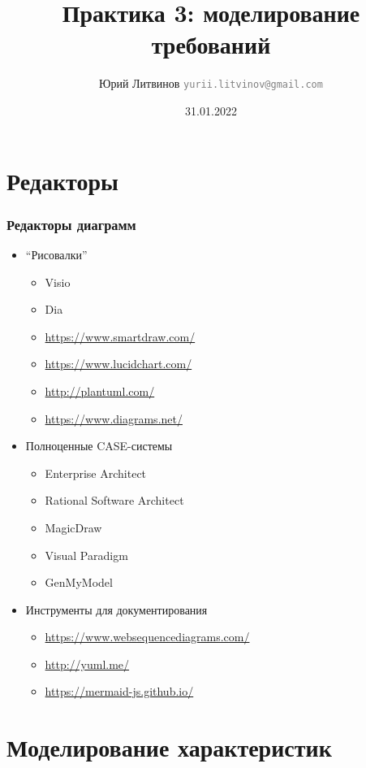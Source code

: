 \documentclass[xetex,mathserif,serif]{beamer}
\title{Практика 3: моделирование требований}
\author[Юрий Литвинов]{Юрий Литвинов \newline \textcolor{gray}{\small\texttt{yurii.litvinov@gmail.com}}}
\date{31.01.2022}
\begin{document}
    
    \frame{\titlepage}

    \section{Редакторы}

    \begin{frame}
        \frametitle{Редакторы диаграмм}
        \begin{itemize}
            \item ``Рисовалки''
            \begin{itemize}
                \item Visio
                \item Dia
                \item \url{https://www.smartdraw.com/}
                \item \url{https://www.lucidchart.com/}
                \item \url{http://plantuml.com/}
                \item \url{https://www.diagrams.net/}
            \end{itemize}
            \item Полноценные CASE-системы
            \begin{itemize}
                \item Enterprise Architect
                \item Rational Software Architect
                \item MagicDraw
                \item Visual Paradigm
                \item GenMyModel
            \end{itemize}
            \item Инструменты для документирования
            \begin{itemize}
                \item \url{https://www.websequencediagrams.com/}
                \item \url{http://yuml.me/}
                \item \url{https://mermaid-js.github.io/}
            \end{itemize}
        \end{itemize}
    \end{frame}


    \section{Моделирование характеристик}
\end{document}
